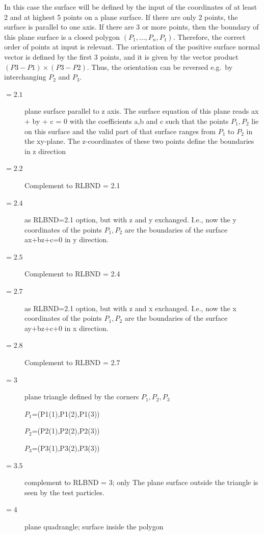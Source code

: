 \begin{description}
        In this case the surface will be defined by the input of the coordinates of at
        least 2 and at highest 5 points on a plane surface.
        If there are only 2 points, the surface is parallel to one axis.
        If there are 3 or more points, then the boundary of this plane surface is a
        closed polygon $(P_1, \dots, P_n, P_1)$.
        Therefore, the correct order of points at input is relevant.
        The orientation of the positive surface normal vector is defined by the first 3
        points, and it is given by the vector product $(P3 - P1) \times (P3 - P2)$.
        Thus, the orientation can be reversed e.g.\ by interchanging $P_2$ and $P_3$.
        \begin{description}
          \item[$= 2.1$] plane surface parallel to z axis.
                The surface equation of this plane reads ax + by + c = 0 with the coefficients
                a,b and c such that the points $P_1, P_2$ lie on this surface and the valid
                part of that surface ranges from $P_1$ to $P_2$ in the xy-plane.
                The z-coordinates of these two points define the boundaries in z direction
          \item[$= 2.2$] Complement to RLBND = 2.1
          \item[$= 2.4$] as RLBND=2.1 option,
                but with z and y exchanged.
                I.e., now the y coordinates of the points $P_1, P_2$ are the boundaries of the
                surface ax+bz+c=0 in y direction.
          \item[$= 2.5$] Complement to RLBND = 2.4
          \item[$= 2.7$] as RLBND=2.1 option,
                but with z and x exchanged.
                I.e., now the x coordinates of the points $P_1, P_2$ are the boundaries of the
                surface ay+bz+c+0 in x direction.
          \item[$= 2.8$] Complement to RLBND = 2.7
          \item[$= 3$] plane triangle defined by
                the corners $P_1, P_2, P_3$ 

                $P_1$=(P1(1),P1(2),P1(3)) 

                $P_2$=(P2(1),P2(2),P2(3)) 

                $P_3$=(P3(1),P3(2),P3(3))
          \item[$= 3.5$] complement to RLBND = 3; only The
                plane surface outside the triangle is seen by the test particles.
          \item[$= 4$] plane quadrangle; surface inside the polygon 


\end{description}
\end{description}
